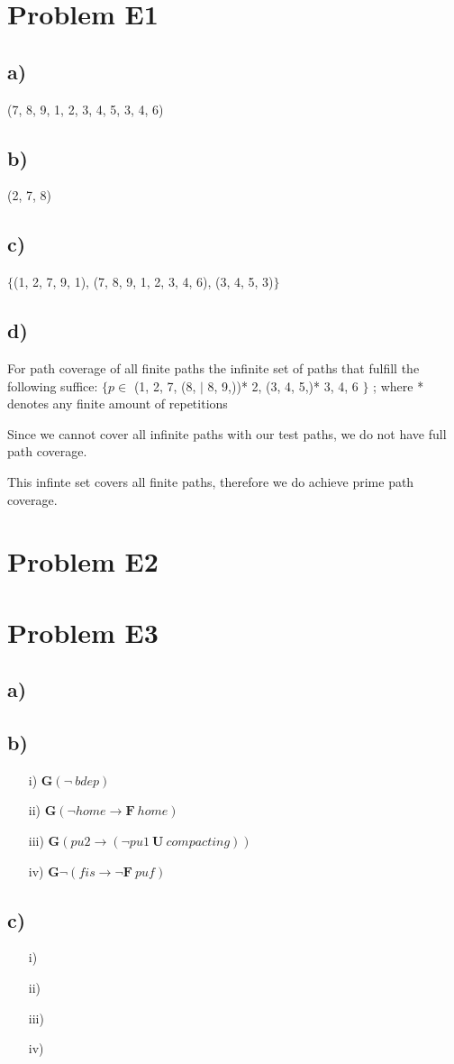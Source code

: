 \documentclass[12pt]{article}
\begin{document}
\lstset{language=C++}

\section*{Problem E1}
\subsection*{a)}
(7, 8, 9, 1, 2, 3, 4, 5, 3, 4, 6)

\subsection*{b)}
(2, 7, 8)

\subsection*{c)}
$\{$(1, 2, 7, 9, 1), (7, 8, 9, 1, 2, 3, 4, 6), (3, 4, 5, 3)$\}$

\subsection*{d)}
For path coverage of all finite paths the infinite set of paths that fulfill the following suffice:
$\{ p \in $ (1, 2, 7, (8, $|$ 8, 9,))* 2, (3, 4, 5,)* 3, 4, 6 $\}$ ; where * denotes any finite amount of repetitions

Since we cannot cover all infinite paths with our test paths, we do not have full path coverage.

This infinte set covers all finite paths, therefore we do achieve prime path coverage. 
\section*{Problem E2}


\section*{Problem E3}
\subsection*{a)}


\subsection*{b)}
\begin{itemize}
	\item[i)] $ \mathbf{G}( \neg \: bdep )$
	\item[ii)] $ \mathbf{G} ( \neg home \rightarrow \mathbf{F} \: home ) $
	\item[iii)] $ \mathbf{G} (pu2 \rightarrow ( \neg pu1 \: \mathbf{U} \: compacting ) ) $
	\item[iv)] $ \mathbf{G} \neg (fis \rightarrow \neg \mathbf{F} \: puf )$
\end{itemize}

\subsection*{c)}
\begin{itemize}
	\item[i)]
	\item[ii)]
	\item[iii)]
	\item[iv)]
\end{itemize}
\end{document}

